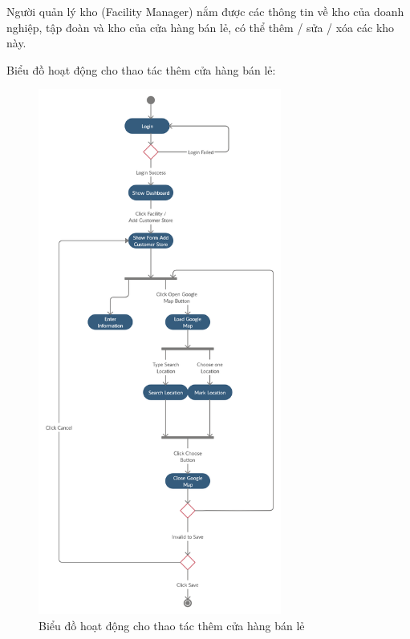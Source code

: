 Người quản lý kho (Facility Manager) nắm được các thông tin
về kho của doanh nghiệp, tập đoàn và kho của cửa hàng bán lẻ,
có thể thêm / sửa / xóa các kho này. 

Biểu đồ hoạt động cho thao tác thêm cửa hàng bán lẻ:
\begin{figure}[H]
\centering
\includegraphics[width=8cm]{images/activity-diagram/add-customer-store.png}
\caption{Biểu đồ hoạt động cho thao tác thêm cửa hàng bán lẻ}
\end{figure}

